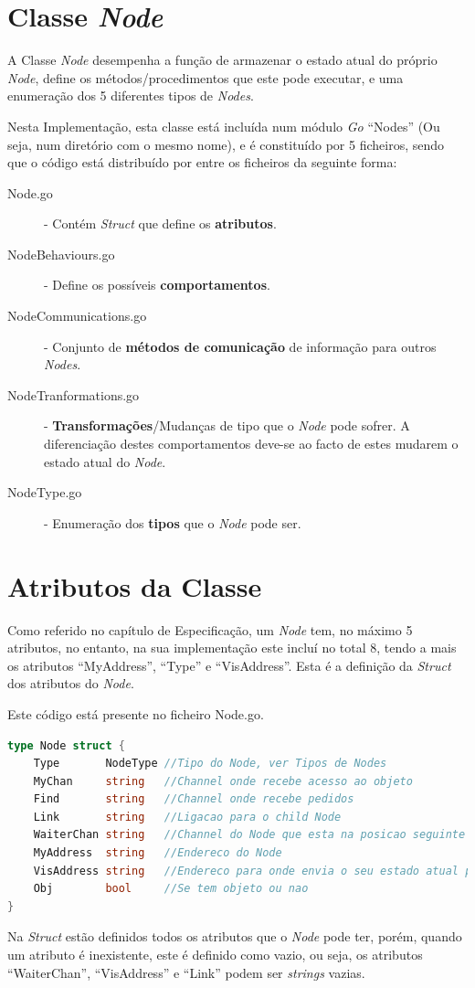\section{Classe \emph{Node}}
A Classe \emph{Node} desempenha a função de armazenar o estado atual do próprio \emph{Node}, define os métodos/procedimentos que este pode executar, e uma enumeração dos 5 diferentes tipos de \emph{Nodes}.



Nesta Implementação, esta classe está incluída num módulo \emph{Go} ``Nodes'' (Ou seja, num diretório com o mesmo nome), e é constituído por 5 ficheiros, sendo que o código está distribuído por entre os ficheiros da seguinte forma:

\begin{description}
    \item [Node.go] - Contém \emph{Struct} que define os \textbf{atributos}.
    \item [NodeBehaviours.go] - Define os possíveis \textbf{comportamentos}.
    \item [NodeCommunications.go] - Conjunto de \textbf{métodos de comunicação} de informação para outros \emph{Nodes}.
    \item [NodeTranformations.go] - \textbf{Transformações}/Mudanças de tipo que o \emph{Node} pode sofrer. A diferenciação destes comportamentos deve-se ao facto de estes mudarem o estado atual do \emph{Node}.
    \item [NodeType.go] - Enumeração dos \textbf{tipos} que o \emph{Node} pode ser.
\end{description} 


\section{Atributos da Classe}
Como referido no capítulo de Especificação, um \emph{Node} tem, no máximo 5 atributos, no entanto, na sua implementação este incluí no total 8, tendo a mais os atributos ``MyAddress'', ``Type'' e ``VisAddress''.
Esta é a definição da \emph{Struct} dos atributos do \emph{Node}.


Este código está presente no ficheiro Node.go.


\begin{lstlisting}[caption={Definição da estrutura \emph{Node}},language=Go]
type Node struct {
	Type       NodeType //Tipo do Node, ver Tipos de Nodes
	MyChan     string   //Channel onde recebe acesso ao objeto
	Find       string   //Channel onde recebe pedidos
	Link       string   //Ligacao para o child Node
	WaiterChan string   //Channel do Node que esta na posicao seguinte da fila
	MyAddress  string   //Endereco do Node
	VisAddress string   //Endereco para onde envia o seu estado atual para a atualizacao da visualizacao
	Obj        bool     //Se tem objeto ou nao 
}

\end{lstlisting}
Na \emph{Struct} estão definidos todos os atributos que o \emph{Node} pode ter, porém, quando um atributo é inexistente, este é definido como vazio, ou seja, os atributos ``WaiterChan'', ``VisAddress'' e ``Link'' podem ser \emph{strings} vazias.

